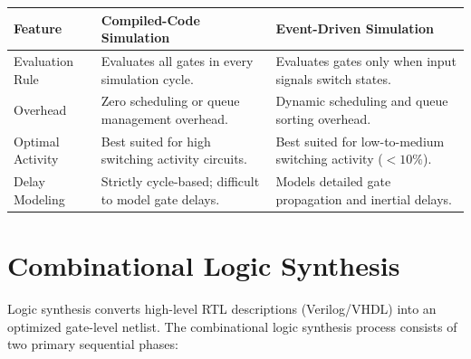 \documentclass[12pt,a4paper]{article}
\renewcommand{\arraystretch}{1.45}
\begin{document}
\par\vspace{6pt}\noindent
{\renewcommand{\arraystretch}{1.35}%
\begin{tabularx}{\linewidth}{|B{3.2cm}|Y|Y|}
\hline
\textbf{Feature} & \textbf{Compiled-Code Simulation} & \textbf{Event-Driven Simulation} \\
\hline
Evaluation Rule & Evaluates all gates in every simulation cycle. & Evaluates gates only when input signals switch states. \\
\hline
Overhead & Zero scheduling or queue management overhead. & Dynamic scheduling and queue sorting overhead. \\
\hline
Optimal Activity & Best suited for high switching activity circuits. & Best suited for low-to-medium switching activity ($<10\%$). \\
\hline
Delay Modeling & Strictly cycle-based; difficult to model gate delays. & Models detailed gate propagation and inertial delays. \\
\hline
\end{tabularx}}

\section{Combinational Logic Synthesis}

Logic synthesis converts high-level RTL descriptions (Verilog/VHDL) into an optimized gate-level netlist. The combinational logic synthesis process consists of two primary sequential phases:
\end{document}
